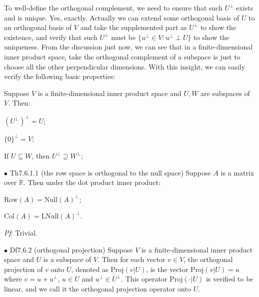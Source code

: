 \documentclass{article}
\begin{document}
\begin{Rmk}{}
    To well-define the orthogonal complement, we need to ensure that such $U^\perp$ exists and is unique. \textcolor{Th}{Yes, exactly. Actually we can extend some orthogonal basis of $U$ to an orthogonal basis of $V$ and take the supplemented part as $U^\perp$ to show the existence, and verify that such $U^\perp$ must be $\{u^\perp\in V: u^\perp\perp U\}$ to show the uniqueness.} From the discussion just now, we can see that \textcolor{Th}{in a finite-dimensional inner product space, take the orthogonal complement of a subspace is just to choose all the other perpendicular dimensions.} With this insight, we can easily verify the following basic properties:
    \textcolor{Th}{Suppose $V$ is a finite-dimensional inner product space and $U, W$ are subspaces of $V$. Then:
        \begin{compactenum}
            \item $(U^\perp)^{\perp} = U$;
            \item $\{0\}^\perp = V$;
            \item If $U\subseteq W$, then $U^\perp\supseteq W^\perp$;
        \end{compactenum}
    }
\end{Rmk}

\begin{Th}{$\bullet$ Th7.6.1.1 (the row space is orthogonal to the null space)}
    Suppose $A$ is a matrix over $\mathbb{R}$. Then under the dot product inner product:
    \begin{compactenum}
        \item $\text{Row}(A) = \text{Null}(A)^\perp$;
        \item $\text{Col}(A) = \text{LNull}(A)^\perp$.
    \end{compactenum}
    \tcblower
    \textit{Pf}: Trivial.
\end{Th}

\begin{Df}{$\bullet$ Df7.6.2 (orthogonal projection)}
    Suppose $V$ is a finite-dimensional inner product space and $U$ is a subspace of $V$. Then for each vector $v\in V$, the orthogonal projection of $v$ onto $U$, denoted as $\text{Proj}(v|U)$, is the vector $\text{Proj}(v|U) = u$ where $v = u+u^\perp$, $u\in U$ and $u^\perp\in U^\perp$. \textcolor{Th}{This operator $\text{Proj}(\cdot|U)$ is verified to be linear}, and we call it the orthogonal projection operator onto $U$.
\end{Df}
\end{document}
